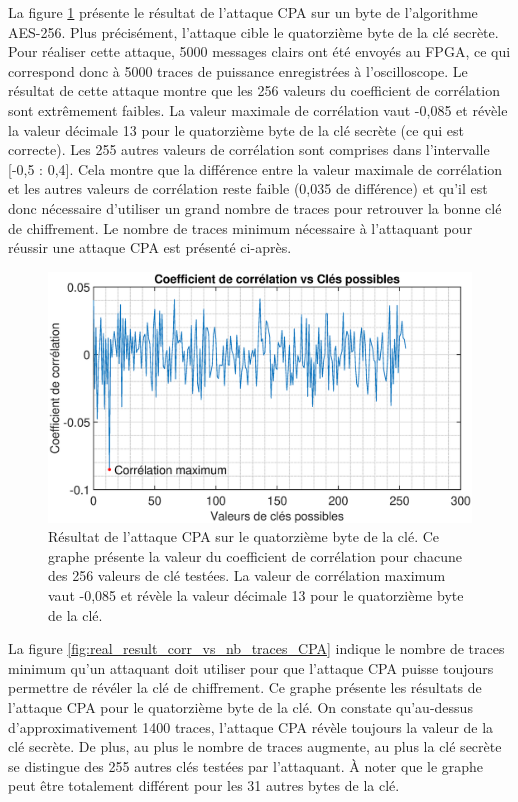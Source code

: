 \documentclass[oneside]{book}
\begin{document}
La figure \ref{fig:real_result_CPA} présente le résultat de l'attaque CPA sur un byte de l'algorithme AES-256. Plus précisément, l'attaque cible le quatorzième byte de la clé secrète. Pour réaliser cette attaque, 5000 messages clairs ont été envoyés au FPGA, ce qui correspond donc à 5000 traces de puissance enregistrées à l'oscilloscope. Le résultat de cette attaque montre que les 256 valeurs du coefficient de corrélation sont extrêmement faibles. La valeur maximale de corrélation vaut -0,085 et révèle la valeur décimale 13 pour le quatorzième byte de la clé secrète (ce qui est correcte). Les 255 autres valeurs de corrélation sont comprises dans l'intervalle [-0,5 : 0,4]. Cela montre que la différence entre la valeur maximale de corrélation et les autres valeurs de corrélation reste faible (0,035 de différence) et qu'il est donc nécessaire d'utiliser un grand nombre de traces pour retrouver la bonne clé de chiffrement. Le nombre de traces minimum nécessaire à l'attaquant pour réussir une attaque CPA est présenté ci-après.

\begin{figure}[ht!]
    \hspace{-1.8cm}
    \includegraphics[scale=0.6]{image/real_result_CPA}
    \caption{Résultat de l'attaque CPA sur le quatorzième byte de la clé. Ce graphe présente la valeur du coefficient de corrélation pour chacune des 256 valeurs de clé testées. La valeur de corrélation maximum vaut -0,085 et révèle la valeur décimale 13 pour le quatorzième byte de la clé.}
    \label{fig:real_result_CPA} 
\end{figure}
\FloatBarrier 

La figure \ref{fig:real_result_corr_vs_nb_traces_CPA} indique le nombre de traces minimum qu'un attaquant doit utiliser pour que l'attaque CPA puisse toujours permettre de révéler la clé de chiffrement. Ce graphe présente les résultats de l'attaque CPA pour le quatorzième byte de la clé. On constate qu'au-dessus d'approximativement 1400 traces, l'attaque CPA révèle toujours la valeur de la clé secrète. De plus, au plus le nombre de traces augmente, au plus la clé secrète se distingue des 255 autres clés testées par l'attaquant. À noter que le graphe peut être totalement différent pour les 31 autres bytes de la clé.
\end{document}
